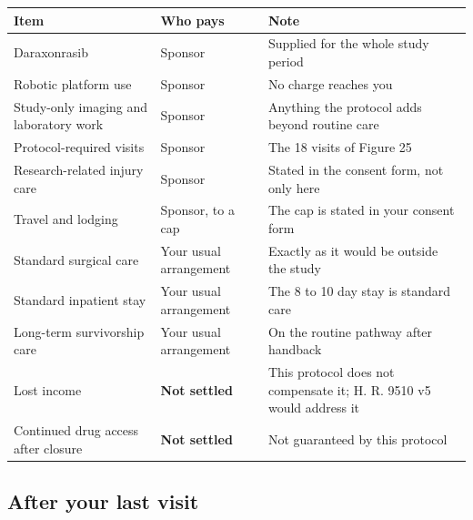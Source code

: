 \noindent\begin{tabularx}{\textwidth}{L{5.0cm} L{3.0cm} Y}
\toprule
\textbf{Item} & \textbf{Who pays} & \textbf{Note} \\
\midrule
Daraxonrasib & Sponsor & Supplied for the whole study period \\
Robotic platform use & Sponsor & No charge reaches you \\
Study-only imaging and laboratory work & Sponsor & Anything the protocol adds beyond routine care \\
Protocol-required visits & Sponsor & The 18 visits of Figure 25 \\
Research-related injury care & Sponsor & Stated in the consent form, not only here \\
Travel and lodging & Sponsor, to a cap & The cap is stated in your consent form \\
Standard surgical care & Your usual arrangement & Exactly as it would be outside the study \\
Standard inpatient stay & Your usual arrangement & The 8 to 10 day stay is standard care \\
Long-term survivorship care & Your usual arrangement & On the routine pathway after handback \\
Lost income & \textbf{Not settled} & This protocol does not compensate it; H. R. 9510 v5 would address it \\
Continued drug access after closure & \textbf{Not settled} & Not guaranteed by this protocol \\
\bottomrule
\end{tabularx}

\vspace{0.30em}

\subsection{After your last visit}


